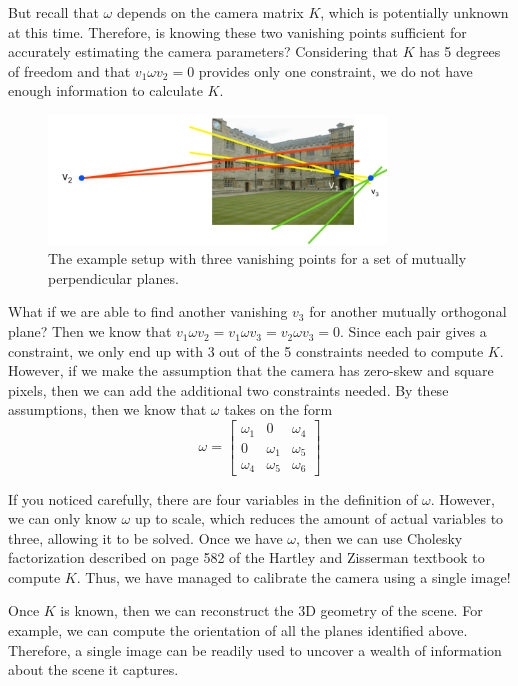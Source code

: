 \documentclass[a4paper, 12pt]{article}
\begin{document}
But recall that $\omega$ depends on the camera matrix $K$, which is potentially unknown at this time. Therefore, is knowing these two vanishing points sufficient for accurately estimating the camera parameters? Considering that $K$ has 5 degrees of freedom and that $v_1 \omega v_2 = 0$ provides only one constraint, we do not have enough information to calculate $K$. 
\begin{figure}[h!]
\centering
\includegraphics[width=0.8\textwidth]{figures/example2.png}
\caption{The example setup with three vanishing points for a set of mutually perpendicular planes.}
\label{fig:example1}
\end{figure}
What if we are able to find another vanishing $v_3$ for another mutually orthogonal plane? Then we know that $v_1\omega v_2 = v_1\omega v_3 = v_2\omega v_3 = 0$. Since each pair gives a constraint, we only end up with 3 out of the 5 constraints needed to compute $K$. However, if we make the assumption that the camera has zero-skew and square pixels, then we can add the additional two constraints needed. By these assumptions, then we know that $\omega$ takes on the form 
\begin{equation}
    \omega = \begin{bmatrix}\omega_1 & 0 & \omega_4 \\ 0 & \omega_1 & \omega_5 \\ \omega_4 & \omega_5 &\omega_6 \end{bmatrix}
\end{equation}

If you noticed carefully, there are four variables in the definition of $\omega$. However, we can only know $\omega$ up to scale, which reduces the amount of actual variables to three, allowing it to be solved. Once we have $\omega$, then we can use Cholesky factorization described on page 582 of the Hartley and Zisserman textbook to compute $K$. Thus, we have managed to calibrate the camera using a single image!

Once $K$ is known, then we can reconstruct the 3D geometry of the scene. For example, we can compute the orientation of all the planes identified above. Therefore, a single image can be readily used to uncover a wealth of information about the scene it captures.
\end{document}
